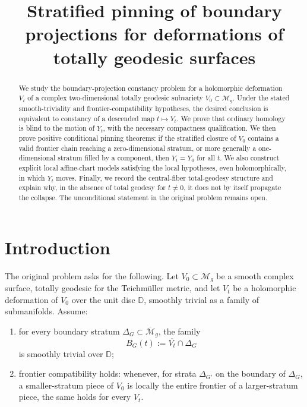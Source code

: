\documentclass[12pt]{article}
\title{Stratified pinning of boundary projections for deformations of totally geodesic surfaces}
\author{}
\date{}
\theoremstyle{plain}
\theoremstyle{definition}
\theoremstyle{remark}
\newcommand{\D}{\mathbb D}
\newcommand{\M}{\mathcal M}
\newcommand{\bMg}{\overline{\M}_g}
\begin{document}
\maketitle

\begin{abstract}
We study the boundary-projection constancy problem for a holomorphic deformation \(V_t\) of a complex two-dimensional totally geodesic subvariety \(V_0\subset \M_g\).  Under the stated smooth-triviality and frontier-compatibility hypotheses, the desired conclusion is equivalent to constancy of a descended map \(t\mapsto Y_t\).  We prove that ordinary homology is blind to the motion of \(Y_t\), with the necessary compactness qualification.  We then prove positive conditional pinning theorems: if the stratified closure of \(V_0\) contains a valid frontier chain reaching a zero-dimensional stratum, or more generally a one-dimensional stratum filled by a component, then \(Y_t=Y_0\) for all \(t\).  We also construct explicit local affine-chart models satisfying the local hypotheses, even holomorphically, in which \(Y_t\) moves.  Finally, we record the central-fiber total-geodesy structure and explain why, in the absence of total geodesy for \(t\neq 0\), it does not by itself propagate the collapse.  The unconditional statement in the original problem remains open.
\end{abstract}

\section{Introduction}

The original problem asks for the following.  Let \(V_0\subset \M_g\) be a smooth complex surface, totally geodesic for the Teichmüller metric, and let \(V_t\) be a holomorphic deformation of \(V_0\) over the unit disc \(\D\), smoothly trivial as a family of submanifolds.  Assume:

\begin{enumerate}[label=(\roman*)]
  \item for every boundary stratum \(\Delta_G\subset \bMg\), the family
  \[
  B_G(t):=\overline{V_t}\cap \Delta_G
  \]
  is smoothly trivial over \(\D\);
  \item frontier compatibility holds: whenever, for strata \(\Delta_{G'}\) on the boundary of \(\Delta_G\), a smaller-stratum piece of \(V_0\) is locally the entire frontier of a larger-stratum piece, the same holds for every \(V_t\).
\end{enumerate}
\end{document}
